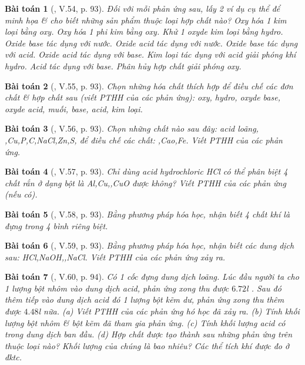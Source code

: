 \documentclass{article}
\newtheorem{baitoan}{Bài toán}
\begin{document}
\begin{baitoan}[\cite{Truong_BTNC_Hoa_Hoc_8_2022}, V.54, p. 93]
	Đối với mỗi phản ứng sau, lấy 2 ví dụ cụ thể để minh họa \& cho biết những sản phẩm thuộc loại hợp chất nào? Oxy hóa 1 kim loại bằng oxy. Oxy hóa 1 phi kim bằng oxy. Khử 1 oxyde kim loại bằng hydro. Oxide base tác dụng với nước. Oxide acid tác dụng với nước. Oxide base tác dụng với acid. Oxide acid tác dụng với base. Kim loại tác dụng với acid giải phóng khí hydro. Acid tác dụng với base. Phân hủy hợp chất giải phóng oxy.
\end{baitoan}

\begin{baitoan}[\cite{Truong_BTNC_Hoa_Hoc_8_2022}, V.55, p. 93]
	Chọn những hóa chất thích hợp để điều chế các đơn chất \& hợp chất sau (viết PTHH của các phản ứng): oxy, hydro, oxyde base, oxyde acid, muối, base, acid, kim loại.
\end{baitoan}

\begin{baitoan}[\cite{Truong_BTNC_Hoa_Hoc_8_2022}, V.56, p. 93]
	Chọn những chất nào sau đây: acid \emph{} loãng, \emph{,Cu,P,C,NaCl,Zn,S,} để điều chế các chất: \emph{,Cao,Fe}. Viết PTHH của các phản ứng.
\end{baitoan}

\begin{baitoan}[\cite{Truong_BTNC_Hoa_Hoc_8_2022}, V.57, p. 93]
	Chỉ dùng acid hydrochloric \emph{HCl} có thể phân biệt 4 chất rắn ở dạng bột là \emph{Al,Cu,,CuO} được không? Viết PTHH của các phản ứng (nếu có).
\end{baitoan}

\begin{baitoan}[\cite{Truong_BTNC_Hoa_Hoc_8_2022}, V.58, p. 93]
	Bằng phương pháp hóa học, nhận biết 4 chất khí là \emph{} đựng trong 4 bình riêng biệt.
\end{baitoan}

\begin{baitoan}[\cite{Truong_BTNC_Hoa_Hoc_8_2022}, V.59, p. 93]
	Bằng phương pháp hóa học, nhận biết các dung dịch sau: \emph{HCl,NaOH,,NaCl}. Viết PTHH của các phản ứng xảy ra.
\end{baitoan}

\begin{baitoan}[\cite{Truong_BTNC_Hoa_Hoc_8_2022}, V.60, p. 94]
	Có 1 cốc đựng dung dịch \emph{} loãng. Lúc đầu người ta cho 1 lượng bột nhôm vào dung dịch acid, phản ứng xong thu được $6.72$\emph{l }. Sau đó thêm tiếp vào dung dịch acid đó 1 lượng bột kẽm dư, phản ứng xong thu thêm được $4.48$\emph{l } nữa. (a) Viết PTHH của các phản ứng hó học đã xảy ra. (b) Tính khối lượng bột nhôm \& bột kẽm đã tham gia phản ứng. (c) Tính khối lượng acid \emph{} có trong dung dịch ban đầu. (d) Hợp chất được tạo thành sau những phản ứng trên thuộc loại nào? Khối lượng của chúng là bao nhiêu? Các thể tích khí được đo ở đktc.
\end{baitoan}
\end{document}

